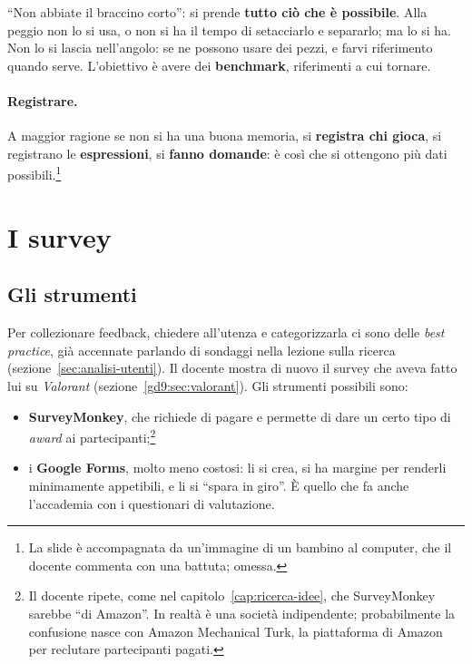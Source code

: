 ``Non abbiate il braccino corto'': si prende \textbf{tutto ciò che è
possibile}. Alla peggio non lo si usa, o non si ha il tempo di setacciarlo e
separarlo; ma lo si ha. Non lo si lascia nell'angolo: se ne possono usare dei
pezzi, e farvi riferimento quando serve. L'obiettivo è avere dei
\textbf{benchmark}, riferimenti a cui tornare.

\paragraph{Registrare.} A maggior ragione se non si ha una buona memoria, si
\textbf{registra chi gioca}, si registrano le \textbf{espressioni}, si
\textbf{fanno domande}: è così che si ottengono più dati
possibili.\footnote{La slide è accompagnata da un'immagine di un bambino al
computer, che il docente commenta con una battuta; omessa.}

\section{I survey}
\label{gd10:sec:survey}



\subsection{Gli strumenti}

Per collezionare feedback, chiedere all'utenza e categorizzarla ci sono
delle \emph{best practice}, già accennate parlando di sondaggi nella lezione
sulla ricerca (sezione~\ref{sec:analisi-utenti}). Il docente mostra di nuovo
il survey che aveva fatto lui su \emph{Valorant}
(sezione~\ref{gd9:sec:valorant}). Gli strumenti possibili sono:
\begin{itemize}
  \item \textbf{SurveyMonkey}, che richiede di pagare e permette di dare un
        certo tipo di \emph{award} ai partecipanti;\footnote{Il docente
        ripete, come nel capitolo~\ref{cap:ricerca-idee}, che SurveyMonkey
        sarebbe ``di Amazon''. In realtà è una società indipendente;
        probabilmente la confusione nasce con Amazon Mechanical Turk, la
        piattaforma di Amazon per reclutare partecipanti pagati.}
  \item i \textbf{Google Forms}, molto meno costosi: li si crea, si ha
        margine per renderli minimamente appetibili, e li si ``spara in
        giro''. È quello che fa anche l'accademia con i questionari di
        valutazione.
\end{itemize}

